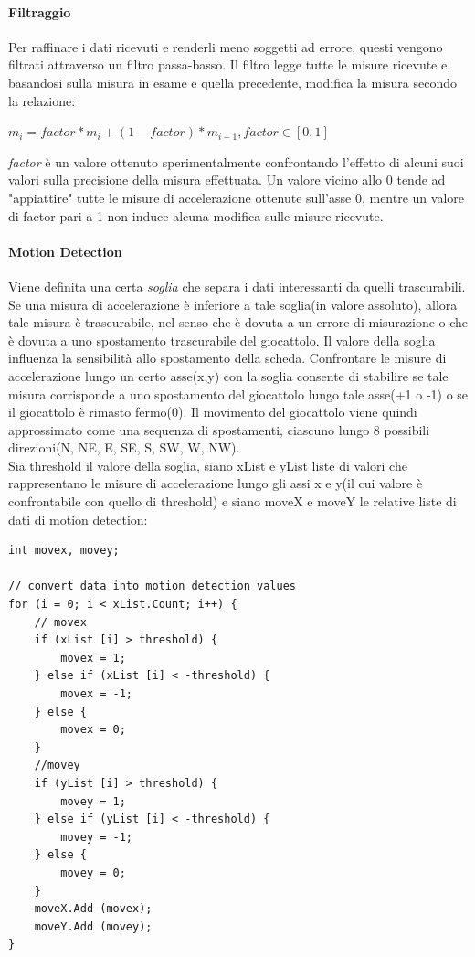 \documentclass[documentation.tex]{subfiles}
\begin{document}
		\paragraph{Filtraggio}Per raffinare i dati ricevuti e renderli meno soggetti ad errore, questi vengono filtrati attraverso un filtro passa-basso. Il filtro legge tutte le misure ricevute e, basandosi sulla misura in esame e quella precedente, modifica la misura secondo la relazione:
		\begin{center}
		$m_{i} = factor * m_{i} + (1 - factor) * m_{i-1}, factor \in [0,1]$
		\end{center}
		\textit{factor} è un valore ottenuto sperimentalmente confrontando l'effetto di alcuni suoi valori sulla precisione della misura effettuata. Un valore vicino allo 0 tende ad "appiattire" tutte le misure di accelerazione ottenute sull'asse 0, mentre un valore di factor pari a 1 non induce alcuna modifica sulle misure ricevute.
		\paragraph{Motion Detection} Viene definita una certa \textit{soglia} che separa i dati interessanti da quelli trascurabili. Se una misura di accelerazione è inferiore a tale soglia(in valore assoluto), allora tale misura è trascurabile, nel senso che è dovuta a un errore di misurazione o che è dovuta a uno spostamento trascurabile del giocattolo. Il valore della soglia influenza la sensibilità allo spostamento della scheda. Confrontare le misure di accelerazione lungo un certo asse(x,y) con la soglia consente di stabilire se tale misura corrisponde a uno spostamento del giocattolo lungo tale asse(+1 o -1) o se il giocattolo è rimasto fermo(0). Il movimento del giocattolo viene quindi approssimato come una sequenza di spostamenti, ciascuno lungo 8 possibili direzioni(N, NE, E, SE, S, SW, W, NW).\\
		Sia threshold il valore della soglia, siano xList e yList liste di valori che rappresentano le misure di accelerazione lungo gli assi x e y(il cui valore è confrontabile con quello di threshold) e siano moveX e moveY le relative liste di dati di motion detection:
		\lstset{style=csharp}
		\begin{lstlisting}
int movex, movey;

// convert data into motion detection values
for (i = 0; i < xList.Count; i++) {
	// movex
	if (xList [i] > threshold) {
		movex = 1;
	} else if (xList [i] < -threshold) {
		movex = -1;
	} else {
		movex = 0;
	}
	//movey
	if (yList [i] > threshold) {
		movey = 1;
	} else if (yList [i] < -threshold) {
		movey = -1;
	} else {
		movey = 0;
	}
	moveX.Add (movex);
	moveY.Add (movey);
}
		\end{lstlisting}
\end{document}
